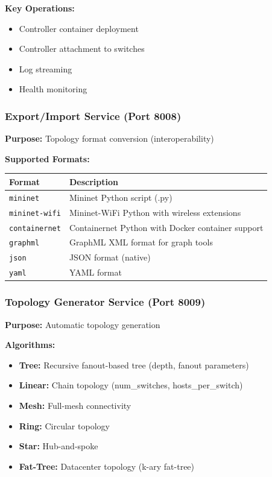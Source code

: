 \documentclass[10pt,a4paper]{article}
\begin{document}
\textbf{Key Operations:}
\begin{itemize}
\item Controller container deployment
\item Controller attachment to switches
\item Log streaming
\item Health monitoring
\end{itemize}

\subsubsection{Export/Import Service (Port 8008)}
\textbf{Purpose:} Topology format conversion (interoperability)

\textbf{Supported Formats:}
\begin{table}[htbp]
\centering
\begin{tabularx}{0.8\textwidth}{lX}
\toprule
\textbf{Format} & \textbf{Description} \\
\midrule
\texttt{mininet} & Mininet Python script (.py) \\
\texttt{mininet-wifi} & Mininet-WiFi Python with wireless extensions \\
\texttt{containernet} & Containernet Python with Docker container support \\
\texttt{graphml} & GraphML XML format for graph tools \\
\texttt{json} & JSON format (native) \\
\texttt{yaml} & YAML format \\
\bottomrule
\end{tabularx}
\end{table}

\subsubsection{Topology Generator Service (Port 8009)}
\textbf{Purpose:} Automatic topology generation

\textbf{Algorithms:}
\begin{itemize}
\item \textbf{Tree:} Recursive fanout-based tree (depth, fanout parameters)
\item \textbf{Linear:} Chain topology (num\_switches, hosts\_per\_switch)
\item \textbf{Mesh:} Full-mesh connectivity
\item \textbf{Ring:} Circular topology
\item \textbf{Star:} Hub-and-spoke
\item \textbf{Fat-Tree:} Datacenter topology (k-ary fat-tree)
\end{itemize}
\end{document}
